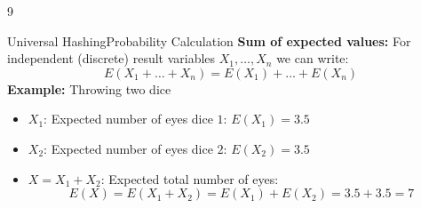 
9%


\begin{frame}{Universal Hashing}{Probability Calculation}
   \textbf{Sum of expected values:}
   For independent (discrete) result variables {\color{Mittel-Blau}$X_1,\dots,X_n$} we can write:
     {\color{Mittel-Blau}\[E\left(X_1+\dots+X_n\right)
       = E(X_1) + \dots + E(X_n)\]}
   \textbf{Example:} Throwing two dice
   \begin{itemize}
     \item<3->
       {\color{Mittel-Blau}$X_1$}: Expected number of eyes dice {\color{Mittel-Blau}$1$}: {\color{Mittel-Blau}$E(X_1) = 3.5$}
     \item<4->
       {\color{Mittel-Blau}$X_2$}: Expected number of eyes dice {\color{Mittel-Blau}$2$}: {\color{Mittel-Blau}$E(X_2) = 3.5$}
     \item<5->
       {\color{Mittel-Blau}$X = X_1 + X_2$}: Expected total number of eyes:
       {\color{Mittel-Blau}\[E(X)
         = E(X_1 + X_2)
         = E(X_1) + E(X_2) = 3.5 + 3.5 = 7\]}
   \end{itemize}
\end{frame}

